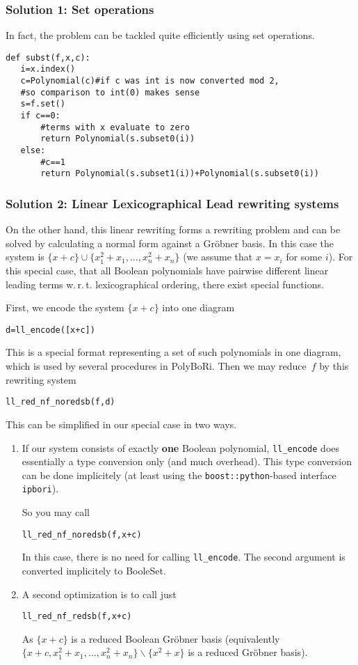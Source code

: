 \documentclass[]{article}
\newcommand{\PolyBoRi}{{\sc PolyBoRi}\xspace}
\newcommand{\Groebner}{Gr\"{o}bner\xspace}
\newcommand{\explfieldequations}{{x_1^2+x_1,\ldots,x_n^2+x_n}}
\begin{document}
\subsubsection{Solution 1: Set operations}
In fact, the problem can be tackled quite efficiently using set operations.
\begin{lstlisting}
def subst(f,x,c):
   i=x.index()
   c=Polynomial(c)#if c was int is now converted mod 2, 
   #so comparison to int(0) makes sense
   s=f.set()
   if c==0:
       #terms with x evaluate to zero
       return Polynomial(s.subset0(i))
   else:
       #c==1
       return Polynomial(s.subset1(i))+Polynomial(s.subset0(i))    
\end{lstlisting}

\subsubsection{Solution 2: Linear Lexicographical Lead rewriting systems}
On the other hand, this linear rewriting forms a rewriting problem and can be solved by calculating a normal form against a \Groebner 
basis.
In this case the system is $\{x+c\} \cup \{\explfieldequations\}$ (we assume that $x=x_i$ for some $i$).
For this special case, that all Boolean polynomials have pairwise different linear leading terms w.\,r.\,t. lexicographical ordering,
there exist special functions.

First, we encode the system $\{x+c\}$ into one diagram
\begin{lstlisting}
d=ll_encode([x+c])    
\end{lstlisting}
%
This is a special format representing a set of such polynomials in one diagram, which is used by several procedures in
\PolyBoRi.
Then we may
reduce~$f$ by this rewriting system
\begin{lstlisting}
ll_red_nf_noredsb(f,d)  
\end{lstlisting}
%
%
This can be simplified in our special case in two ways.
\begin{enumerate}
    \item If our system consists of exactly \textbf{one} Boolean polynomial,
    \lstinline|ll_encode| does essentially  a type conversion only (and much overhead).
    This type conversion can be done implicitely (at least using the
\lstinline|boost::python|-based  interface \lstinline|ipbori|).

    So you may call
\begin{lstlisting}
ll_red_nf_noredsb(f,x+c)  
\end{lstlisting}
%
    In this case, there is no need for calling \lstinline|ll_encode|.
    The second argument is converted implicitely to BooleSet.
    \item A second optimization is to call just
\begin{lstlisting}
ll_red_nf_redsb(f,x+c)
\end{lstlisting}
    As $\{x+c\}$ is a reduced Boolean \Groebner basis (equivalently $\{x+c,\explfieldequations\}\backslash \{x^2+x\}$ is a reduced 
\Groebner 
basis).
\end{enumerate}
\end{document}
